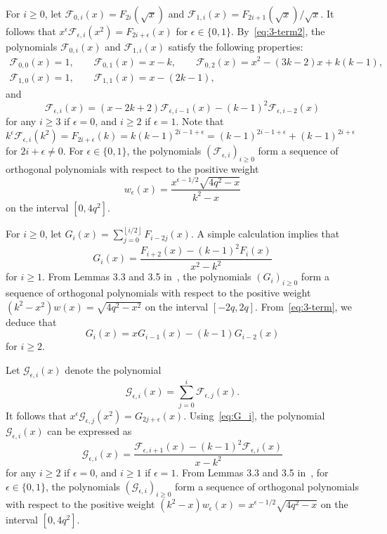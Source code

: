 \documentclass[10pt]{amsart}
\providecommand{\floor}[1]{\left\lfloor#1\right\rfloor}
\begin{document}
For $i\geq 0$, let $\mathscr{F}_{0,i}(x)=F_{2i}(\sqrt{x})$ and $\mathscr{F}_{1,i}(x)=F_{2i+1}(\sqrt{x})/\sqrt{x}$. 
It follows that $x^{\epsilon} \mathscr{F}_{\epsilon,i}(x^2)=F_{2i+\epsilon}(x)$ for $\epsilon\in \{0,1\}$. 
By~\eqref{eq:3-term2}, the polynomials $\mathscr{F}_{0,i}(x)$ and $\mathscr{F}_{1,i}(x)$ satisfy the following properties:
\begin{gather*}
\mathscr{F}_{0,0}(x)=1, \qquad 
\mathscr{F}_{0,1}(x)=x-k, \qquad
\mathscr{F}_{0,2}(x)=x^2-(3k-2)x+k(k-1), 
\\
\mathscr{F}_{1,0}(x)=1, \qquad 
\mathscr{F}_{1,1}(x)=x-(2k-1),
\end{gather*}
and 
\begin{equation} \label{eq:new_3-term}
\mathscr{F}_{\epsilon, i}(x)=(x-2k+2) \mathscr{F}_{\epsilon,i-1}(x)-(k-1)^2 \mathscr{F}_{\epsilon, i-2}(x)
\end{equation}
for any $i\geq 3$ if $\epsilon=0$, and $i\geq 2$ if $\epsilon=1$. 
Note that $k^{\epsilon} \mathscr{F}_{\epsilon,i}(k^2)=F_{2i+\epsilon}(k)=k(k-1)^{2i-1+\epsilon}=(k-1)^{2i-1+\epsilon}+(k-1)^{2i+\epsilon}$ for $2i+\epsilon \ne 0$. 
For $\epsilon\in \{0,1\}$, the polynomials $(\mathscr{F}_{\epsilon,i})_{i\geq 0}$ form a sequence of orthogonal polynomials with respect to the positive weight 
\[
w_\epsilon(x)=\frac{x^{\epsilon-1/2} \sqrt{4q^2-x}}{k^2-x}
\]
on the interval $[0, 4q^2]$. 

For $i\geq 0$, let $G_i(x)=\sum_{j=0}^{\floor{i/2}}F_{i-2j}(x)$. A simple calculation implies that
\begin{equation} \label{eq:G_i}
{G}_{i}(x)=
\frac{{F}_{i+2}(x)-(k-1)^2 {F}_{i}(x) }{x^2-k^2}
\end{equation}
for $i\geq 1$.
From Lemmas 3.3 and 3.5 in~\cite{CK07}, the polynomials $(G_i)_{i\geq 0}$ form a sequence of 
orthogonal polynomials with respect to 
the positive weight $(k^2-x^2)w(x)=\sqrt{4q^2-x^2}$ on the interval $[-2q,2q]$. From~\eqref{eq:3-term}, we deduce that
\[
G_i(x)=xG_{i-1}(x)-(k-1)G_{i-2}(x)
\]
for $i\geq 2$. 

Let $\mathscr{G}_{\epsilon, i}(x)$ denote the 
polynomial 
\begin{equation} \label{eq:def_scrG}
\mathscr{G}_{\epsilon, i}(x)=\sum_{j=0}^i
\mathscr{F}_{\epsilon, j}(x). 
\end{equation} 
It follows that 
$x^{\epsilon} \mathscr{G}_{\epsilon, j}(x^2)=G_{2j+\epsilon}(x)$. Using~\eqref{eq:G_i}, the polynomial $\mathscr{G}_{\epsilon, i}(x)$ can be expressed as
\begin{equation} \label{eq:pro_scrG}
\mathscr{G}_{\epsilon, i}(x)=
\frac{\mathscr{F}_{\epsilon, i+1}(x)-(k-1)^2\mathscr{F}_{\epsilon, i}(x) }{x-k^2}
\end{equation}
for any $i\geq 2$ if $\epsilon=0$, and
$i\geq 1$ if $\epsilon=1$. 
From Lemmas 3.3 and 3.5 in~\cite{CK07}, 
for $\epsilon\in \{0,1\}$, the polynomials $(\mathscr{G}_{\epsilon,i})_{i\geq 0}$ form a sequence of orthogonal polynomials with respect to 
the positive weight $(k^2-x)w_{\epsilon}(x)=x^{\epsilon-1/2}\sqrt{4q^2-x}$ on the interval $[0,4q^2]$. 
\end{document}
